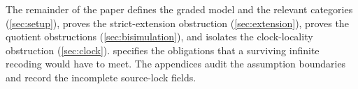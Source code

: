 The remainder of the paper defines the graded model and the relevant
categories (\cref{sec:setup}), proves the strict-extension obstruction
(\cref{sec:extension}), proves the quotient obstructions
(\cref{sec:bisimulation}), and isolates the clock-locality obstruction
(\cref{sec:clock}).   specifies the obligations that a
surviving infinite recoding would have to meet.  The appendices audit the
assumption boundaries and record the incomplete source-lock fields.
